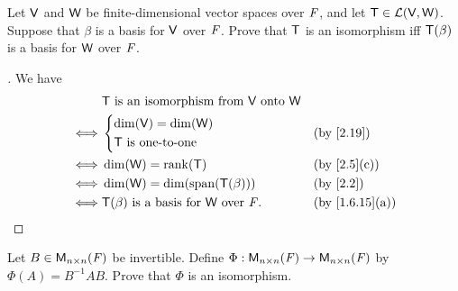 \setcounter{ex}{14}
\begin{ex}\label{ex:2.4.15}
	Let \(\mathsf{V}\) and \(\mathsf{W}\) be finite-dimensional vector spaces over \(\mathit{F}\), and let \(\mathsf{T} \in \mathcal{L}(\mathsf{V}, \mathsf{W})\).
	Suppose that \(\beta\) is a basis for \(\mathsf{V}\) over \(\mathit{F}\).
	Prove that \(\mathsf{T}\) is an isomorphism iff \(\mathsf{T}(\beta)\) is a basis for \(\mathsf{W}\) over \(\mathit{F}\).
\end{ex}

\begin{proof}[]
	We have
	\begin{align*}
		     & \T \text{ is an isomorphism from } \V \text{ onto } \W                     \\
		\iff & \begin{dcases}
			       \dim(\V) = \dim(\W) \\
			       \T \text{ is one-to-one}
		       \end{dcases}                               &  & \by{2.19}                  \\
		\iff & \dim(\W) = \rk{\T}                                     &  & \by{2.5}[c]    \\
		\iff & \dim(\W) = \dim(\spn{\T(\beta)})                       &  & \by{2.2}       \\
		\iff & \T(\beta) \text{ is a basis for } \W \text{ over } \F. &  & \by{1.6.15}[a]
	\end{align*}
\end{proof}

\begin{ex}\label{ex:2.4.16}
	Let \(B \in \ms[n][n][\F]\) be invertible.
	Define \(\Phi : \ms[n][n][\F] \to \ms[n][n][\F]\) by \(\Phi(A) = B^{-1} AB\).
	Prove that \(\Phi\) is an isomorphism.
\end{ex}

